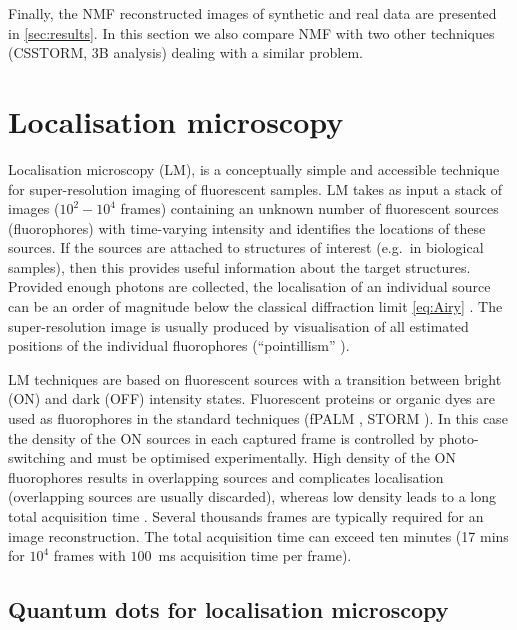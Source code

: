 Finally, the NMF reconstructed images of synthetic and real data are presented in \autoref{sec:results}. In this section we also compare NMF with two other techniques (CSSTORM, 3B analysis) dealing with a similar problem. 


\section{Localisation microscopy\label{sec:LM}}

Localisation microscopy (LM), is a conceptually simple and accessible technique for super-resolution imaging of fluorescent samples. LM takes as input a stack of images ($10^2-10^4$ frames) containing an unknown number of fluorescent sources (fluorophores) with time-varying intensity and identifies the locations of these sources. If the sources are attached to structures of interest (e.g.\ in biological samples), then this provides useful information about the target structures. Provided enough photons are collected, the localisation of an individual source can be an order of magnitude below the classical diffraction limit \autoref{eq:Airy} \cite{Ober2004}. The super-resolution image is usually produced by visualisation of all estimated positions of the individual fluorophores (``pointillism'' \cite{Lidke2005}). 

LM techniques are based on fluorescent sources with a transition between bright (ON) and dark (OFF) intensity states. Fluorescent proteins or organic dyes are used as fluorophores in the standard techniques (fPALM \cite{Hess2006}, STORM \cite{Rust2006}). In this case the density of the ON sources in each captured frame is controlled by photo-switching and must be optimised experimentally. High density of the ON fluorophores results in overlapping sources and complicates localisation (overlapping sources are usually discarded), whereas low density leads to a long total acquisition time \cite{Small2009}. Several thousands frames are typically required for an image reconstruction. The total acquisition time can exceed ten minutes (17 mins for $10^4$ frames with $100$~ms acquisition time per frame). 


\subsection{Quantum dots for localisation microscopy\label{sec:QD for LM}}

